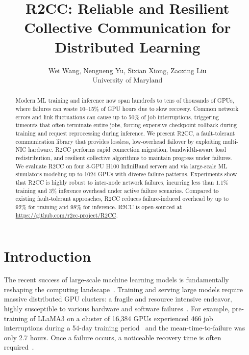 \documentclass[letterpaper,twocolumn,10pt]{article}
\begin{document}
\pagestyle{empty}

\date{}

\title{\Large \bf R2CC: Reliable and Resilient Collective Communication for Distributed Learning}

\author{
{\rm Wei Wang, Nengneng Yu, Sixian Xiong, Zaoxing Liu}\\
University of Maryland
}

\maketitle


\begin{abstract}
Modern ML training and inference now span hundreds to tens of thousands of GPUs, where failures can waste 10–15\% of GPU hours due to slow recovery. Common network errors and link fluctuations can cause up to 50\% of job interruptions, triggering timeouts that often terminate entire jobs, forcing expensive checkpoint rollback during training and request reprocessing during inference. We present R2CC, a fault-tolerant communication library that provides lossless, low-overhead failover by exploiting multi-NIC hardware. R2CC performs rapid connection migration, bandwidth-aware load redistribution, and resilient collective algorithms to maintain progress under failures. We evaluate R2CC on four 8-GPU H100 InfiniBand servers and via large-scale ML simulators modeling up to 1024 GPUs with diverse failure patterns. Experiments show that R2CC is highly robust to inter-node network failures, incurring less than 1.1\% training and 3\% inference overhead under active failure scenarios. Compared to existing fault-tolerant approaches, R2CC reduces failure-induced overhead by up to 92\% for training and 98\% for inference. R2CC is open-sourced at \url{https://github.com/r2cc-project/R2CC}.

\end{abstract}




\section{Introduction}

The recent success of large-scale machine learning models is fundamentally reshaping the computing landscape~\cite{hu2024characterization, choudhury2024mast, gangidi2024rdma, qian2024alibaba}. Training and serving large models require massive distributed GPU clusters: a fragile and resource intensive endeavor, highly susceptible to various hardware and software failures~\cite{megascale, gandhi2024recycle}. For example, pre-training of LLaMA3 on a cluster of 16,384 GPUs experienced 466 job interruptions during a 54-day training period~\cite{llama3} and the mean-time-to-failure was only 2.7 hours. Once a failure occurs, a noticeable recovery time is often required~\cite{unicron,megascale}.
\end{document}
